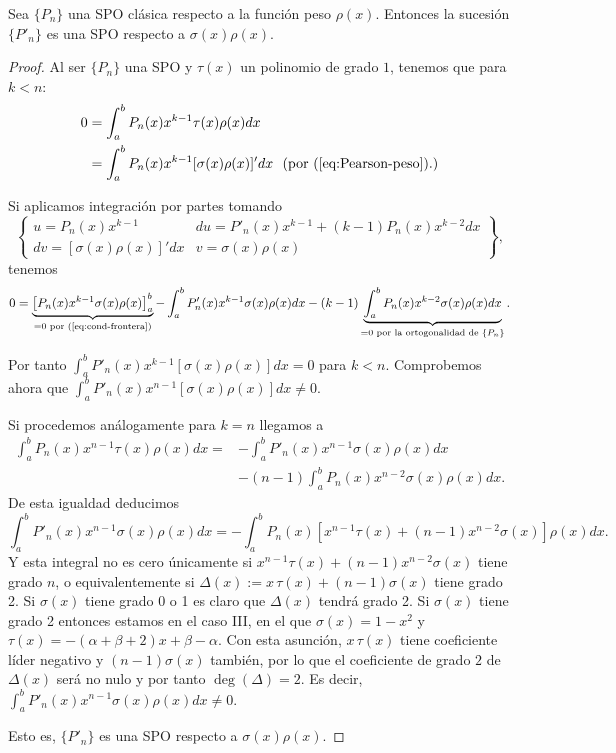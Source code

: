 \begin{teorema}
    \label{th:ortogonalidad-derivadas}
    Sea $\{P_n\}$ una SPO clásica respecto a la función peso $\rho(x)$. Entonces la sucesión $\{P'_n\}$ es una SPO respecto a $\sigma(x)\rho(x)$.
\end{teorema}
\begin{proof}
    Al ser $\{P_n\}$ una SPO y $\tau(x)$ un polinomio de grado $1$, tenemos que para $k<n$:
    \begin{equation*}
        \begin{split}
            0 &= \int_a^b P_n(x)x^{k-1}\tau(x)\rho(x)dx \\
            &= \int_a^b P_n(x)x^{k-1}[\sigma(x)\rho(x)]'dx \ \ \text{(por (\ref{eq:Pearson-peso}).)}
        \end{split}
    \end{equation*}

    Si aplicamos integración por partes tomando $$\left\{\begin{array}{ll}
       u=P_n(x)x^{k-1} & du = P'_n(x)x^{k-1} + (k-1)P_n(x)x^{k-2}dx\\
       dv =  [\sigma(x)\rho(x)]'dx  & v=\sigma(x)\rho(x)
    \end{array}\right\},$$ tenemos
    \begin{equation*}
        0 = \underbrace{\left[P_n(x)x^{k-1}\sigma(x)\rho(x)\right]_a^b}_{=0 \text{ por (\ref{eq:cond-frontera})}} - \int_a^b P'_n(x)x^{k-1}\sigma(x)\rho(x)dx - (k-1)\underbrace{\int_a^b P_n(x)x^{k-2}\sigma(x)\rho(x)dx}_{=0 \text{ por la ortogonalidad de } \{P_n\}}.
    \end{equation*}

    Por tanto $\int_a^b P'_n(x)x^{k-1}[\sigma(x)\rho(x)]dx=0$ para $k<n$. Comprobemos ahora que $\int_a^b P'_n(x)x^{n-1}[\sigma(x)\rho(x)]dx\neq0$.

    Si procedemos análogamente para $k=n$ llegamos a
    \begin{equation*}
        \begin{split}
            \int_a^b P_n(x)x^{n-1}\tau(x)\rho(x)dx = &- \int_a^b P'_n(x)x^{n-1}\sigma(x)\rho(x)dx\\ & - (n-1)\int_a^b P_n(x)x^{n-2}\sigma(x)\rho(x)dx.
        \end{split}
    \end{equation*}
    De esta igualdad deducimos
    $$
    \int_a^b P'_n(x)x^{n-1}\sigma(x)\rho(x)dx = - \int_a^b P_n(x)[x^{n-1}\tau(x) + (n-1)x^{n-2}\sigma(x)]\rho(x)dx.
    $$
    Y esta integral no es cero únicamente si $x^{n-1}\tau(x) + (n-1)x^{n-2}\sigma(x)$ tiene grado $n$, o equivalentemente si $\Delta(x):=x\,\tau(x) + (n-1)\sigma(x)$ tiene grado 2. Si $\sigma(x)$ tiene grado 0 o 1 es claro que $\Delta(x)$ tendrá grado 2. Si $\sigma(x)$ tiene grado 2 entonces estamos en el caso III, en el que $\sigma(x)=1-x^2$ y $\tau(x)=-(\alpha+\beta+2)x+\beta -\alpha$. Con esta asunción, $x\,\tau(x)$ tiene coeficiente líder negativo y $(n-1)\sigma(x)$ también, por lo que el coeficiente de grado $2$ de $\Delta(x)$ será no nulo y por tanto $\deg(\Delta)=2$. Es decir, $\int_a^b P'_n(x)x^{n-1}\sigma(x)\rho(x)dx \neq 0$.
    
    Esto es, $\{P'_n\}$ es una SPO respecto a $\sigma(x)\rho(x)$.
\end{proof}


